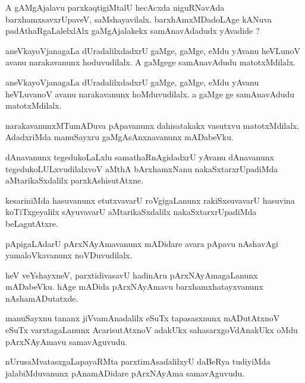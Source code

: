 \documentclass{article}
\begin{document}
\begin{mn}
A gAMgAjalavu parxkaqtigiMtalU hecAcxda niguRNavAda barxhamxsavxrUpaveV, saMshayavilalx. 
barxhAmxMDadoLAge kANuva padAthaRgaLalelxlAlx gaMgAjalakekx samAnavAdadudx yAvadide ?
\end{mn}


\begin{mn}
aneVkayoVjanagaLa dUradalilxdadxrU gaMge, gaMge, eMdu yAvanu heVLunoV avanu narakavanunx 
hoduvudilalx. A gaMgege samAnavAdudu matotxMdilalx.
\end{mn}

\begin{mn}
aneVkayoVjanagaLa dUradalilxdadxrU gaMge, gaMge, eMdu  yAvanu heVLuvanoV avanu narakavanunx 
hoMduvudilalx. a gaMge ge samAnavAdudu matotxMdilalx.
\end{mn}

\begin{mn}
narakavanunxMTumADuva pApavanunx dahisatakakx vasutxvu matotxMdilalx. AdadxriMda manuSayxru 
gaMgAsAnxnavanunx mADabeVku.
\end{mn}

\begin{mn}
dAnavanunx tegedukoLaLxlu samathaRnAgidadxrU yAvanu dAnavanunx tegedukoLULxvudilalxvoV aMthA 
bArxhamxNanu nakaSxtarxrUpadiMda aMtarikaSxdalilx parxkAshisutAtxne.
\end{mn}

\begin{mn}
kesariniMda hasuvanunx etutxvavarU roVgigaLanunx rakiSxsuvavarU hasuvina koTiTxgeyalilx 
sAyuvavarU aMtarikaSxdalilx  nakaSxtarxrUpadiMda beLagutAtxre.
\end{mn}

\begin{mn}
pApigaLAdarU pArxNAyAmavanunx mADidare avara pApavu nAshavAgi yamaloVkavanunx noVDuvudilalx.
\end{mn}

\begin{mn}
heV veYshayxneV, parxtidivasavU hadinAru pArxNAyAmagaLanunx mADabeVku. hAge mADida pArxNAyAmavu 
barxhamxhatayxvanunx nAshamADutatxde.
\end{mn}

\begin{mn}
manuSayxnu tananx jiVvamAnadalilx eSuTx tapasasxnunx mADutAtxnoV eSuTx varxtagaLanunx 
AcarisutAtxnoV adakUkx sahasarxgoVdAnakUkx oMdu pArxNAyAmavu samavAguvudu.
\end{mn}

\begin{mn}
nUrusaMvatasxgaLapayaRMta parxtimAsadalilxyU daBeRya tudiyiMda jalabiMduvanunx pAnamADidare 
pArxNAyAma samavAguvudu.
\end{mn}
\end{document}
